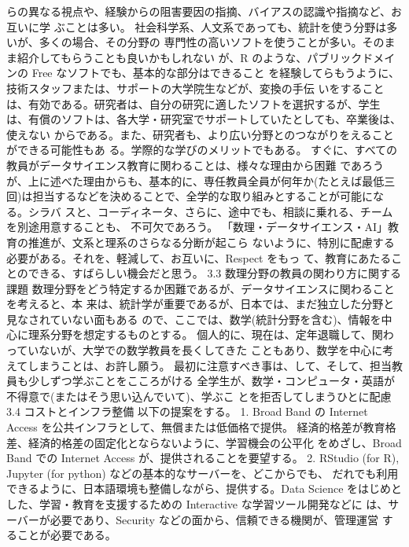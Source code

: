 \documentclass[
]{book}
\theoremstyle{definition}
\theoremstyle{definition}
\theoremstyle{definition}
\theoremstyle{definition}
\theoremstyle{remark}
\begin{document}
らの異なる視点や、経験からの阻害要因の指摘、バイアスの認識や指摘など、お互いに学 ぶことは多い。
社会科学系、人文系であっても、統計を使う分野は多いが、多くの場合、その分野の 専門性の高いソフトを使うことが多い。そのまま紹介してもらうことも良いかもしれない が、R のような、パブリックドメインの Free なソフトでも、基本的な部分はできること を経験してらもうように、技術スタッフまたは、サポートの大学院生などが、変換の手伝 いをすることは、有効である。研究者は、自分の研究に適したソフトを選択するが、学生 は、有償のソフトは、各大学・研究室でサポートしていたとしても、卒業後は、使えない からである。また、研究者も、より広い分野とのつながりをえることができる可能性もあ る。学際的な学びのメリットでもある。
すぐに、すべての教員がデータサイエンス教育に関わることは、様々な理由から困難 であろうが、上に述べた理由からも、基本的に、専任教員全員が何年か(たとえば最低三 回)は担当するなどを決めることで、全学的な取り組みとすることが可能になる。シラバ スと、コーディネータ、さらに、途中でも、相談に乗れる、チームを別途用意することも、 不可欠であろう。
「数理・データサイエンス・AI」教育の推進が、文系と理系のさらなる分断が起こら ないように、特別に配慮する必要がある。それを、軽減して、お互いに、Respect をもっ て、教育にあたることのできる、すばらしい機会だと思う。
3.3 数理分野の教員の関わり方に関する課題
数理分野をどう特定するか困難であるが、データサイエンスに関わることを考えると、本 来は、統計学が重要であるが、日本では、まだ独立した分野と見なされていない面もある ので、ここでは、数学(統計分野を含む)、情報を中心に理系分野を想定するものとする。 個人的に、現在は、定年退職して、関わっていないが、大学での数学教員を長くしてきた こともあり、数学を中心に考えてしまうことは、お許し願う。
最初に注意すべき事は、して、そして、担当教員も少しずつ学ぶことをこころがける 全学生が、数学・コンピュータ・英語が不得意で(またはそう思い込んでいて)、学ぶこ とを拒否してしまうひとに配慮
3.4 コストとインフラ整備 以下の提案をする。
1. Broad Band の Internet Access を公共インフラとして、無償または低価格で提供。 経済的格差が教育格差、経済的格差の固定化とならないように、学習機会の公平化 をめざし、Broad Band での Internet Access が、提供されることを要望する。
2. RStudio (for R), Jupyter (for python) などの基本的なサーバーを、どこからでも、 だれでも利用できるように、日本語環境も整備しながら、提供する。Data Science をはじめとした、学習・教育を支援するための Interactive な学習ツール開発などに は、サーバーが必要であり、Security などの面から、信頼できる機関が、管理運営 することが必要である。
\end{document}

